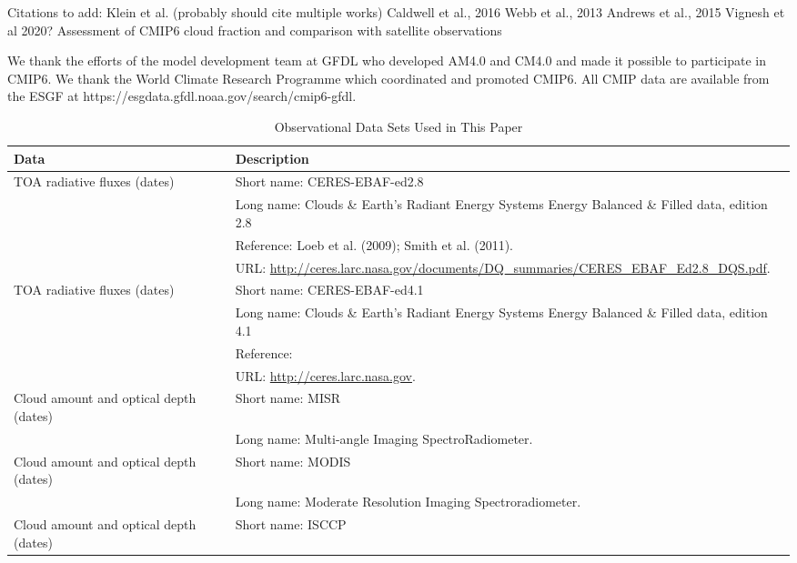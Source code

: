\documentclass[draft]{agujournal2019}
\begin{document}
Citations to add: 
Klein et al. (probably should cite multiple works)
Caldwell et al., 2016
Webb et al., 2013
Andrews et al., 2015
Vignesh et al 2020?    Assessment of CMIP6 cloud fraction and comparison with satellite observations

\acknowledgments
We thank the efforts of the model development team at GFDL who developed AM4.0 and CM4.0 and made it possible to participate in CMIP6.  We thank the World Climate Research Programme which coordinated and promoted CMIP6.  All CMIP data are available from the ESGF at https://esgdata.gfdl.noaa.gov/search/cmip6-gfdl.  

 \begin{sidewaystable}
 \caption{ Observational Data Sets Used in This Paper}
 \centering
 \begin{tabular}{l l}
 \hline
 Data  & Description  \\
 \hline
   TOA radiative fluxes (dates)  & Short name: CERES-EBAF-ed2.8   \\
                                     & Long name: Clouds \& Earth's Radiant Energy Systems Energy Balanced \& Filled data, edition 2.8  \\
                                     & Reference: Loeb et al. (2009); Smith et al. (2011).  \\
                                     & URL: \url{http://ceres.larc.nasa.gov/documents/DQ_summaries/CERES_EBAF_Ed2.8_DQS.pdf}.   \\
   TOA radiative fluxes (dates)  & Short name: CERES-EBAF-ed4.1   \\
                                     & Long name: Clouds \& Earth's Radiant Energy Systems Energy Balanced \& Filled data, edition 4.1  \\
                                     & Reference:   \\
                                     & URL: \url{http://ceres.larc.nasa.gov}.   \\
   Cloud amount and optical depth (dates) & Short name:  MISR   \\
                                                                   &  Long name: Multi-angle Imaging SpectroRadiometer.  \\
   Cloud amount and optical depth (dates)  & Short name: MODIS  \\
                                                                   & Long name: Moderate Resolution Imaging Spectroradiometer.  \\
   Cloud amount and optical depth (dates)  & Short name: ISCCP   \\

\end{tabular}
\end{sidewaystable}
\end{document}
